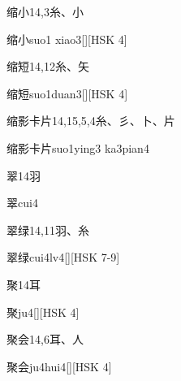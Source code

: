 \begin{Entry}{缩小}{14,3}{⽷、⼩}
  \begin{Phonetics}{缩小}{suo1 xiao3}[][HSK 4]
  \end{Phonetics}
\end{Entry}

\begin{Entry}{缩短}{14,12}{⽷、⽮}
  \begin{Phonetics}{缩短}{suo1duan3}[][HSK 4]
  \end{Phonetics}
\end{Entry}

\begin{Entry}{缩影卡片}{14,15,5,4}{⽷、⼺、⼘、⽚}
  \begin{Phonetics}{缩影卡片}{suo1ying3 ka3pian4}
  \end{Phonetics}
\end{Entry}

\begin{Entry}{翠}{14}{⽻}
  \begin{Phonetics}{翠}{cui4}
  \end{Phonetics}
\end{Entry}

\begin{Entry}{翠绿}{14,11}{⽻、⽷}
  \begin{Phonetics}{翠绿}{cui4lv4}[][HSK 7-9]
  \end{Phonetics}
\end{Entry}

\begin{Entry}{聚}{14}{⽿}
  \begin{Phonetics}{聚}{ju4}[][HSK 4]
  \end{Phonetics}
\end{Entry}

\begin{Entry}{聚会}{14,6}{⽿、⼈}
  \begin{Phonetics}{聚会}{ju4hui4}[][HSK 4]
  \end{Phonetics}
\end{Entry}

